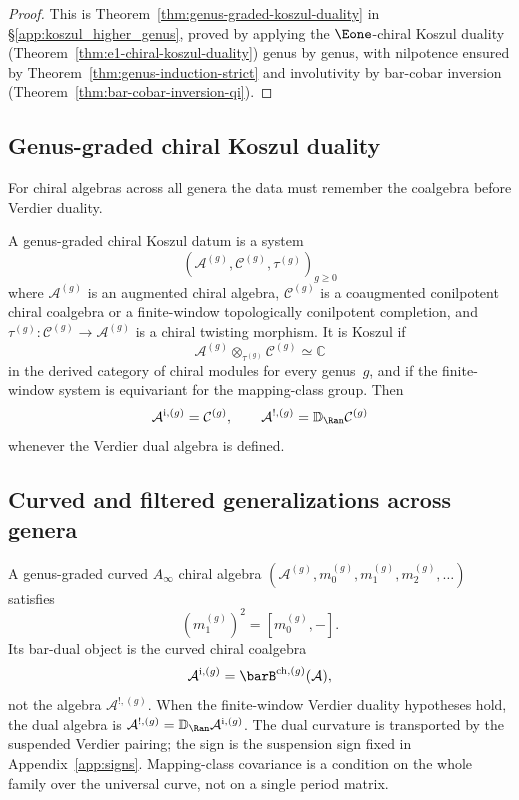 \begin{proof}
This is Theorem~\ref{thm:genus-graded-koszul-duality} in
\S\ref{app:koszul_higher_genus}, proved by applying the $\Eone$-chiral Koszul
duality (Theorem~\ref{thm:e1-chiral-koszul-duality}) genus by genus, with
nilpotence ensured by Theorem~\ref{thm:genus-induction-strict} and
involutivity by bar-cobar inversion
(Theorem~\ref{thm:bar-cobar-inversion-qi}).
\end{proof}

\subsection{Genus-graded chiral Koszul duality}

For chiral algebras across all genera the data must remember the
coalgebra before Verdier duality.

\begin{definition}
A genus-graded chiral Koszul datum is a system
\[
(\mathcal{A}^{(g)},\mathcal{C}^{(g)},\tau^{(g)})_{g\geq 0}
\]
where $\mathcal{A}^{(g)}$ is an augmented chiral algebra,
$\mathcal{C}^{(g)}$ is a coaugmented conilpotent chiral coalgebra
or a finite-window topologically conilpotent completion,
and $\tau^{(g)}\colon\mathcal{C}^{(g)}\to\mathcal{A}^{(g)}$ is a
chiral twisting morphism. It is Koszul if
\[
\mathcal{A}^{(g)}\otimes_{\tau^{(g)}}\mathcal{C}^{(g)}
\simeq \mathbb{C}
\]
in the derived category of chiral modules for every genus~$g$, and if
the finite-window system is equivariant for the mapping-class group.
Then
\[
\mathcal{A}^{\mathrm i,(g)}=\mathcal{C}^{(g)},
\qquad
\mathcal{A}^{!,(g)}=\mathbb{D}_{\Ran}\mathcal{C}^{(g)}
\]
whenever the Verdier dual algebra is defined.
\end{definition}

\subsection{Curved and filtered generalizations across genera}

\begin{definition}
A genus-graded curved $A_\infty$ chiral algebra
$(\mathcal{A}^{(g)},m_0^{(g)},m_1^{(g)},m_2^{(g)},\ldots)$ satisfies
\[
(m_1^{(g)})^2=[m_0^{(g)},-].
\]
Its bar-dual object is the curved chiral coalgebra
\[
\mathcal{A}^{\mathrm i,(g)}=\barB^{\mathrm{ch},(g)}(\mathcal{A}),
\]
not the algebra $\mathcal{A}^{!,(g)}$. When the finite-window Verdier
duality hypotheses hold, the dual algebra is
$\mathcal{A}^{!,(g)}=\mathbb{D}_{\Ran}\mathcal{A}^{\mathrm i,(g)}$.
The dual curvature is transported by the suspended Verdier pairing;
the sign is the suspension sign fixed in
Appendix~\ref{app:signs}. Mapping-class covariance is a
condition on the whole family over the universal curve, not on a
single period matrix.
\end{definition}

